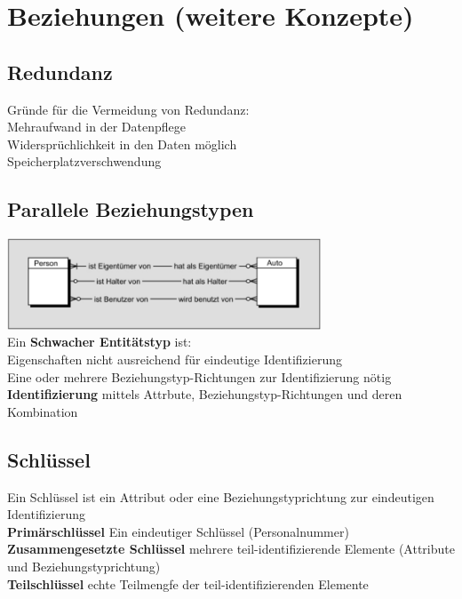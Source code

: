 \documentclass{scrreprt}
\newcommand\tab[1][1cm]{\hspace*{#1}}
\begin{document}
\section{Beziehungen (weitere Konzepte)}
\subsection{Redundanz}
Gründe für die Vermeidung von Redundanz:
\\\tab Mehraufwand in der Datenpflege
\\\tab Widersprüchlichkeit in den Daten möglich 
\\\tab Speicherplatzverschwendung
\subsection{Parallele Beziehungstypen}
\includegraphics[width=0.7\textwidth]{"graphics/parallel-bz"}
\\ Ein \textbf{Schwacher Entitätstyp} ist:
\\\tab Eigenschaften nicht ausreichend für eindeutige Identifizierung
\\\tab Eine oder mehrere Beziehungstyp-Richtungen zur Identifizierung nötig
\\\textbf{Identifizierung} mittels Attrbute, Beziehungstyp-Richtungen und deren Kombination
\subsection{Schlüssel}
Ein Schlüssel ist ein Attribut oder eine Beziehungstyprichtung zur eindeutigen Identifizierung
\\\textbf{Primärschlüssel}
Ein eindeutiger Schlüssel (Personalnummer)
\\\textbf{Zusammengesetzte Schlüssel}
mehrere teil-identifizierende Elemente (Attribute und Beziehungstyprichtung)
\\\textbf{Teilschlüssel}
echte Teilmengfe der teil-identifizierenden Elemente
\end{document}
